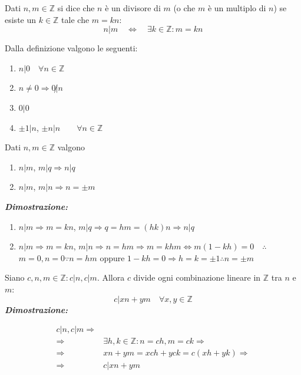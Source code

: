 \documentclass[oneside]{book}
\begin{document}
\begin{tcolorbox}[colback=yellow!30, colframe=yellow!30!black, title=Divisibilità]
Dati $n,m \in \mathbb{Z}$ si dice che $n$ è un divisore di
$m$ (o che $m$ è un multiplo di $n$) se esiste un $k \in \mathbb{Z}$
tale che $m = kn$:
\[ n|m \quad \Longleftrightarrow \quad \exists k \in \mathbb{Z}: m = kn\]
\end{tcolorbox}

\begin{osservaz}
Dalla definizione valgono le seguenti:
\begin{enumerate}
    \item $n|0 \quad \forall n \in \mathbb{Z}$
    \item $n \not = 0 \Longrightarrow 0 \not | n$
    \item $0|0$
    \item $\pm 1 | n$, $\pm n|n \qquad \forall n \in \mathbb{Z}$
\end{enumerate}
\end{osservaz}

\begin{tcolorbox}[title={Proprietà della divisibilità}]
Dati $n,m\in\mathbb{Z}$ valgono
\begin{enumerate}
    \item $n|m$, $m|q \Longrightarrow n|q$
    \item $n|m$, $m|n \Longrightarrow n = \pm m$
\end{enumerate}
\textit{\textbf{Dimostrazione:}}
\begin{enumerate}
    \item $n|m \Rightarrow m = kn$, $m|q \Rightarrow q = hm = (hk)n \Longrightarrow n|q$
    \item $n|m \Rightarrow m = kn$, $m|n \Rightarrow n = hm \Longrightarrow m = khm \Longleftrightarrow m(1-kh) = 0 \quad \therefore \quad$ $m = 0, n = 0 \because n = hm$ oppure
    $1 - kh = 0 \Longrightarrow h = k = \pm 1 \therefore n = \pm m$
\end{enumerate}
\cvd
\end{tcolorbox}

\begin{tcolorbox}[colback=violet!30, colframe=violet!30!black, title={Lemma utile}]
Siano $c,n,m\in\mathbb{Z}:c|n,c|m$. Allora $c$ divide ogni combinazione lineare
in $\mathbb{Z}$ tra $n$ e $m$:
\[ c|xn+ym \quad \forall x,y\in\mathbb{Z} \]
\textit{\textbf{Dimostrazione:}}

\begin{align*}
    c|n,c|m \Rightarrow&\\
    \Rightarrow &\exists h,k\in\mathbb{Z}:n=ch,m=ck \Rightarrow\\
    \Rightarrow &xn+ym=xch+yck=c(xh+yk) \Rightarrow\\
    \Rightarrow &c|xn+ym
\end{align*}

\cvd
\end{tcolorbox}
\end{document}

